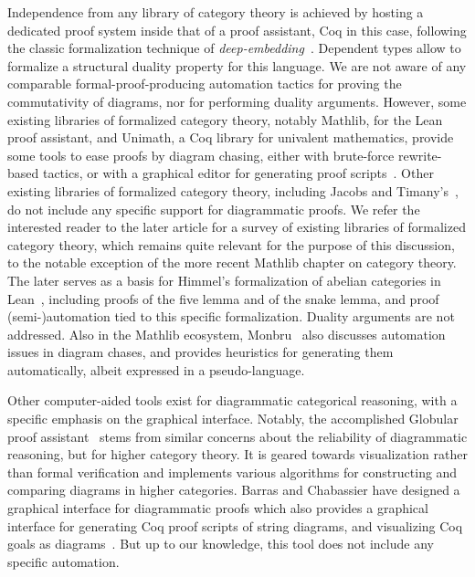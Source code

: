\documentclass[10pt,a4paper]{article}
\newcommand{\namefont}[1]{\textsf{#1}}
\newcommand{\Coq}{\namefont{Coq}\xspace}
\renewcommand{\~}{\widetilde}
\begin{document}
Independence from any library of category theory is achieved by hosting a dedicated proof system inside that of a proof assistant, \Coq in this case, following the classic formalization technique of \emph{deep-embedding}~\cite{DBLP:conf/tpcd/BoultonGGHHT92}. Dependent types allow to formalize a structural duality property for this language. We are not aware of any comparable formal-proof-producing automation tactics for proving the commutativity of diagrams, nor for performing duality arguments. However, some existing libraries of formalized category theory, notably \textsf{Mathlib}, for the \textsf{Lean} proof assistant, and \textsf{Unimath}, a \Coq{} library for univalent mathematics, provide some tools to ease proofs by diagram chasing, either with brute-force rewrite-based tactics, or with a graphical editor for generating proof scripts~\cite{lafont}. Other existing libraries of formalized category theory, including Jacobs and Timany's~\cite{DBLP:conf/rta/Timany016}, do not include any specific support for diagrammatic proofs. We refer the interested reader to the later article for a survey of existing libraries of formalized category theory, which remains quite relevant for the purpose of this discussion, to the notable exception of the more recent \textsf{Mathlib} chapter on category theory. The later serves as a basis for Himmel's formalization of abelian categories in \textsf{Lean}~\cite{himmel}, including proofs of the five lemma and of the snake lemma, and proof (semi-)automation tied to this specific formalization. Duality arguments are not addressed. Also in the \textsf{Mathlib} ecosystem, Monbru~\cite{monbru} also discusses automation issues in diagram chases, and provides heuristics for generating them automatically, albeit expressed in a pseudo-language.

Other computer-aided tools exist for diagrammatic categorical reasoning, with a specific emphasis on the graphical interface. Notably, the accomplished \textsf{Globular} proof assistant~\cite{DBLP:journals/lmcs/BarKV18} stems from similar concerns about the reliability of diagrammatic reasoning, but for higher category theory. It is  geared towards visualization rather than formal verification and implements various algorithms for constructing and comparing diagrams in higher categories. Barras and Chabassier have designed a graphical interface for diagrammatic proofs which also provides a graphical interface for generating \Coq{} proof scripts of string diagrams, and visualizing \Coq{} goals as diagrams~\cite{barras-chabassier}. But up to our knowledge, this tool does not include any specific automation.
\end{document}
